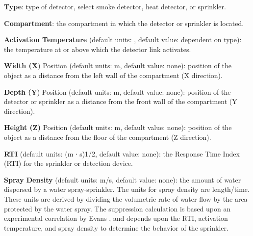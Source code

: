 \textbf{Type}: type of detector, select smoke detector, heat detector, or sprinkler.

\textbf{Compartment}: the compartment in which the detector or sprinkler is located.

\textbf{Activation Temperature} (default units: \degc, default value: dependent on type): the temperature at or above which the detector link activates.

\textbf{Width (X}) Position (default units: m, default value: none): position of the object as a distance from the left wall of the compartment (X direction).

\textbf{Depth (Y}) Position (default units: m, default value: none): position of the detector or sprinkler as a distance from the front wall of the compartment (Y direction).

\textbf{Height (Z)} Position (default units: m, default value: none): position of the object as a distance from the floor of the compartment (Z direction).

\textbf{RTI} (default units: (m ∙ s)1/2, default value: none): the Response Time Index (RTI) for the sprinkler or detection device.

\textbf{Spray Density} (default units: m/s, default value: none): the amount of water dispersed by a water spray-sprinkler.  The units for spray density are length/time.  These units are derived by dividing the volumetric rate of water flow by the area protected by the water spray. The suppression calculation is based upon an experimental correlation by Evans , and depends upon the RTI, activation temperature, and spray density to determine the behavior of the sprinkler.

